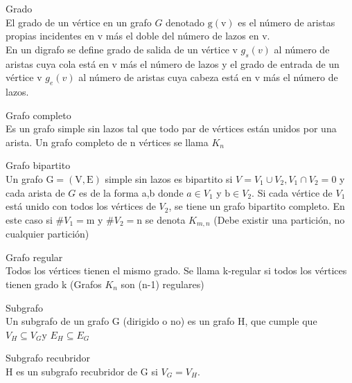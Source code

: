 \documentclass{article}
\begin{document}
\begin{defn}
Grado \\ El grado de un vértice en un grafo $G$ denotado $\mathrm{g}(\mathrm{v})$ es el número de aristas propias incidentes en v más el doble del número de lazos en v. \\ En un digrafo se define grado de salida de un vértice v $g_{s}(v)$ al número de aristas cuya cola está en v más el número de lazos y el grado de entrada de un vértice v $g_{e}(v)$ al número de aristas cuya cabeza está en $\mathrm{v}$ más el número de lazos.
\end{defn}

\begin{defn}
Grafo completo \\ Es un grafo simple sin lazos tal que todo par de vértices están unidos por una arista. Un grafo completo de n vértices se llama $K_{n}$
\end{defn}

\begin{defn}
Grafo bipartito \\ Un grafo $\mathrm{G}=(\mathrm{V}, \mathrm{E})$ simple sin lazos es bipartito si $V=V_{1} \cup V_{2}, V_{1} \cap V_{2}=0$ y cada arista de $G$ es de la forma a,b donde $a \in V_{1}$ y $\mathrm{b} \in V_{2}$. Si cada vértice de $V_{1}$ está unido con todos los vértices de $V_{2}$, se tiene un grafo bipartito completo. En este caso si $\# V_{1}=\mathrm{m}$ y $\#V_{2}=\mathrm{n}$ se denota $K_{m, n}$ (Debe existir una partición, no cualquier partición)
\end{defn}

\begin{defn}
Grafo regular \\ Todos los vértices tienen el mismo grado. Se llama k-regular si todos los vértices tienen grado k (Grafos $K_{n}$ son (n-1) regulares)
\end{defn}

\begin{defn}
Subgrafo \\ Un subgrafo de un grafo G (dirigido o no) es un grafo $\mathrm{H}$, que cumple que $V_{H} \subseteq V_{G} \mathrm{y}$ ${E}_{H} \subseteq {E}_{G}$
\end{defn}

\begin{defn}
Subgrafo recubridor \\ $\mathrm{H}$ es un subgrafo recubridor de $\mathrm{G}$ si $V_{G}=V_{H} .$
\end{defn}
\end{document}
